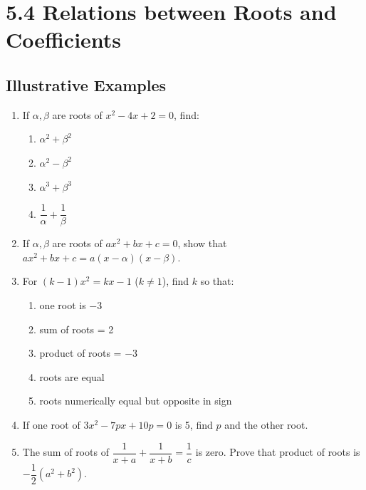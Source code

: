 \documentclass[12pt,a4paper]{article}
\begin{document}
\section{5.4 Relations between Roots and Coefficients}

\subsection{Illustrative Examples}

\begin{enumerate}[label=Example \arabic*.]
    \item If \( \alpha, \beta \) are roots of \( x^2 - 4x + 2 = 0 \), find:
    \begin{enumerate}[label=(\roman*)]
        \item \( \alpha^2 + \beta^2 \)
        \item \( \alpha^2 - \beta^2 \)
        \item \( \alpha^3 + \beta^3 \)
        \item \( \dfrac{1}{\alpha} + \dfrac{1}{\beta} \)
    \end{enumerate}

    \item If \( \alpha, \beta \) are roots of \( ax^2 + bx + c = 0 \), show that \( ax^2 + bx + c = a(x - \alpha)(x - \beta) \).

    \item For \( (k-1)x^2 = kx - 1 \) (\( k \neq 1 \)), find \( k \) so that:
    \begin{enumerate}[label=(\roman*)]
        \item one root is \( -3 \)
        \item sum of roots = 2
        \item product of roots = \( -3 \)
        \item roots are equal
        \item roots numerically equal but opposite in sign
    \end{enumerate}

    \item If one root of \( 3x^2 - 7px + 10p = 0 \) is 5, find \( p \) and the other root.

    \item The sum of roots of \( \dfrac{1}{x+a} + \dfrac{1}{x+b} = \dfrac{1}{c} \) is zero. Prove that product of roots is \( -\dfrac{1}{2}(a^2 + b^2) \).


\end{enumerate}
\end{document}
